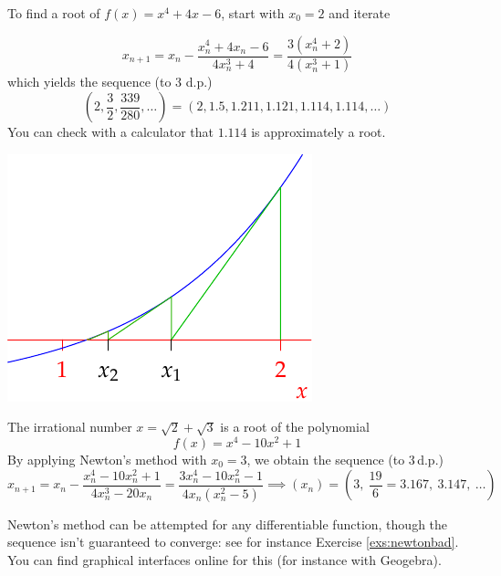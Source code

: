 \begin{examples}{}{}
	\exstart To find a root of $f(x)=x^4+4x-6$, start with $x_0=2$ and iterate
	\begin{enumerate}\setcounter{enumi}{1}
		\begin{minipage}[t]{0.62\linewidth}\vspace{-10pt}
			\item[]
			\[
				x_{n+1}=x_n-\frac{x_n^4+4x_n-6}{4x_n^3+4} =\frac{3(x_n^4+2)}{4(x_n^3+1)}
			\]
			which yields the sequence (to 3 d.p.)
			\[
				\left(2,\frac 32,\frac{339}{280},\ldots\right)=(2,1.5,1.211,1.121,1.114,1.114,\ldots)
			\]
			You can check with a calculator that $1.114$ is approximately a root.
		\end{minipage}
		\hfill
		\begin{minipage}[t]{0.37\linewidth}\vspace{-8pt}
			\flushright\includegraphics[scale=0.95]{newton-raphson2}
		\end{minipage}
	
		\item The irrational number $x=\sqrt 2+\sqrt 3$ is a root of the polynomial
		\[
			f(x)=x^4-10x^2+1
		\]
		By applying Newton's method with $x_0=3$, we obtain the sequence (to 3\,d.p.)
		\[
			x_{n+1}=x_n-\frac{x_n^4-10x_n^2+1}{4x_n^3-20x_n} =\frac{3x_n^4-10x_n^2-1}{4x_n(x_n^2-5)} \implies (x_n)=\left(3,\ \frac{19}6=3.167,\ %
			3.147,\ \ldots \right)
		\]
	\end{enumerate}
\end{examples}

\goodbreak

Newton's method can be attempted for any differentiable function, though the sequence isn't guaranteed to converge: see for instance Exercise \ref{exs:newtonbad}. You can find graphical interfaces online for this (for instance with Geogebra).



